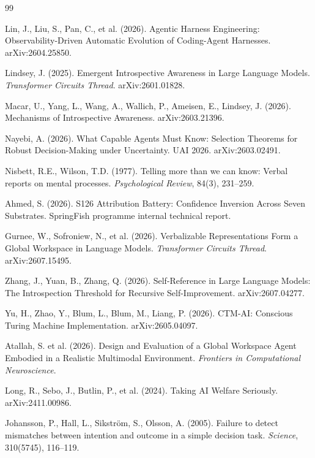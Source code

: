 \documentclass[11pt]{article}
\begin{document}

\begin{thebibliography}{99}

Lin, J., Liu, S., Pan, C., et al. (2026).
Agentic Harness Engineering: Observability-Driven Automatic Evolution of
Coding-Agent Harnesses. arXiv:2604.25850.

Lindsey, J. (2025).
Emergent Introspective Awareness in Large Language Models.
\emph{Transformer Circuits Thread}. arXiv:2601.01828.

Macar, U., Yang, L., Wang, A., Wallich, P., Ameisen, E., Lindsey, J. (2026).
Mechanisms of Introspective Awareness. arXiv:2603.21396.

Nayebi, A. (2026).
What Capable Agents Must Know: Selection Theorems for Robust Decision-Making
under Uncertainty. UAI 2026. arXiv:2603.02491.

Nisbett, R.E., Wilson, T.D. (1977).
Telling more than we can know: Verbal reports on mental processes.
\emph{Psychological Review}, 84(3), 231--259.

Ahmed, S. (2026).
S126 Attribution Battery: Confidence Inversion Across Seven Substrates.
SpringFish programme internal technical report.

Gurnee, W., Sofroniew, N., et al. (2026).
Verbalizable Representations Form a Global Workspace in Language Models.
\emph{Transformer Circuits Thread}. arXiv:2607.15495.

Zhang, J., Yuan, B., Zhang, Q. (2026).
Self-Reference in Large Language Models: The Introspection Threshold for
Recursive Self-Improvement. arXiv:2607.04277.

Yu, H., Zhao, Y., Blum, L., Blum, M., Liang, P. (2026).
CTM-AI: Conscious Turing Machine Implementation. arXiv:2605.04097.

Atallah, S. et al. (2026).
Design and Evaluation of a Global Workspace Agent Embodied in a Realistic
Multimodal Environment. \emph{Frontiers in Computational Neuroscience}.

Long, R., Sebo, J., Butlin, P., et al. (2024).
Taking AI Welfare Seriously. arXiv:2411.00986.

Johansson, P., Hall, L., Sikstr\"om, S., Olsson, A. (2005).
Failure to detect mismatches between intention and outcome in a simple
decision task. \emph{Science}, 310(5745), 116--119.


\end{thebibliography}
\end{document}

